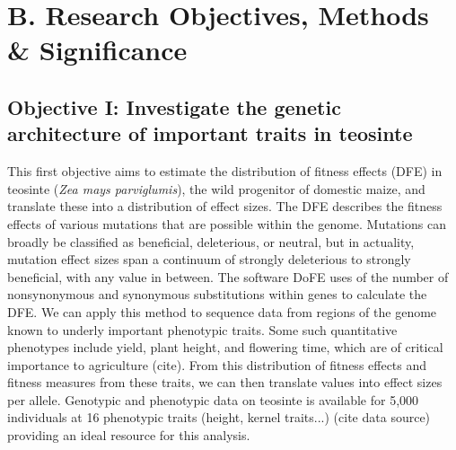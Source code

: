 
\section*{B. Research Objectives, Methods \& Significance}
\subsection*{Objective I: Investigate the genetic architecture of important traits in teosinte}


This first objective aims to estimate the distribution of fitness effects (DFE) in teosinte (\emph{Zea mays parviglumis}), the wild progenitor of domestic maize, and translate these into a distribution of effect sizes. The DFE describes the fitness effects of various mutations that are possible within the genome. Mutations can broadly be classified as beneficial, deleterious, or neutral, but in actuality, mutation effect sizes span a continuum of strongly deleterious to strongly beneficial, with any value in between. The software DoFE \citep{Keightley:2007hq} uses of the number of nonsynonymous and synonymous substitutions within genes to calculate the DFE. We can apply this method to sequence data from regions of the genome known to underly important phenotypic traits. Some such quantitative phenotypes include yield, plant height, and flowering time, which are of critical importance to agriculture (cite). From this distribution of fitness effects and fitness measures from these traits, we can then translate values into effect sizes per allele. Genotypic and phenotypic data on teosinte is available for 5,000 individuals at 16 phenotypic traits (height, kernel traits...) (cite data source) providing an ideal resource for this analysis.

